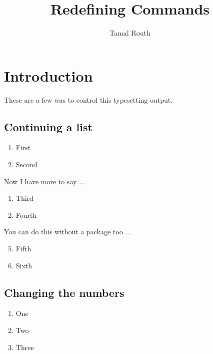 \documentclass{article}
\title{Redefining Commands}
\author{Tamal Routh}
\begin{document}
\maketitle

\section{Introduction}

These are a few was to control this typesetting output.

\subsection{Continuing a list}

\begin{enumerate}

 \item First
 
 \item Second
 
\end{enumerate}


Now I have more to say ...

\begin{enumerate}[resume]

 \item Third
 
 \item Fourth
 
\end{enumerate}

You can do this without a package too ...

\begin{enumerate}

\setcounter{enumi}{4}

 \item Fifth
 
 \item Sixth
 
\end{enumerate}

\subsection{Changing the numbers}

\renewcommand{\theenumi}{\Alph{enumi}}

\begin{enumerate}
 \item One
 
 \item Two
 
 \item Three
 
\end{enumerate}
\end{document}
